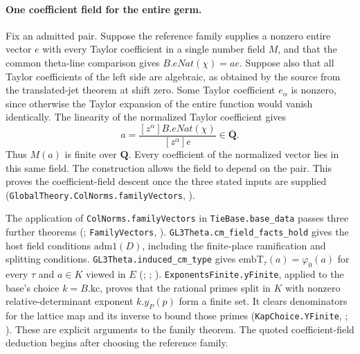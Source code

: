 \paragraph{One coefficient field for the entire germ.}
Fix an admitted pair. Suppose the reference family supplies a nonzero entire vector \(e\) with every Taylor coefficient in a single number field \(M\), and that the common theta-line comparison gives \(B.eNat(\chi)=a e\). Suppose also that all Taylor coefficients of the left side are algebraic, as obtained by the source from the translated-jet theorem at shift zero. Some Taylor coefficient \(e_\alpha\) is nonzero, since otherwise the Taylor expansion of the entire function would vanish identically. The linearity of the normalized Taylor coefficient gives
\[
 a=\frac{[z^\alpha] B.eNat(\chi)}{[z^\alpha]e}\in\overline{\mathbf Q}.
\]
Thus \(M(a)\) is finite over \(\mathbf Q\). Every coefficient of the normalized vector lies in this same field. The construction allows the field to depend on the pair. This proves the coefficient-field descent once the three stated inputs are supplied (\nolinkurl{GlobalTheory.ColNorms.familyVectors}, ).

The application of \nolinkurl{ColNorms.familyVectors} in
\nolinkurl{TieBase.base_data} passes three further theorems
(;
\nolinkurl{FamilyVectors}, ).
\nolinkurl{GL3Theta.cm_field_facts_hold} gives the host field conditions
\(\mathrm{adm1}(D)\), including the finite-place ramification and splitting
conditions. \nolinkurl{GL3Theta.induced_cm_type} gives
\(\mathrm{embT}_\tau(a)=\varphi_0(a)\) for every \(\tau\) and \(a\in K\)
viewed in \(E\) (;
;
).
\nolinkurl{ExponentsFinite.yFinite}, applied to the base's
choice \(k=B.\mathrm{kc}\), proves that the rational primes split in \(K\)
with nonzero relative-determinant exponent \(k.y_P(p)\) form a finite set.
It clears denominators for the lattice map and its inverse to bound those
primes (\nolinkurl{KapChoice.YFinite}, ;
).
These are explicit arguments to the family theorem. The quoted
coefficient-field deduction begins after choosing the reference family.

